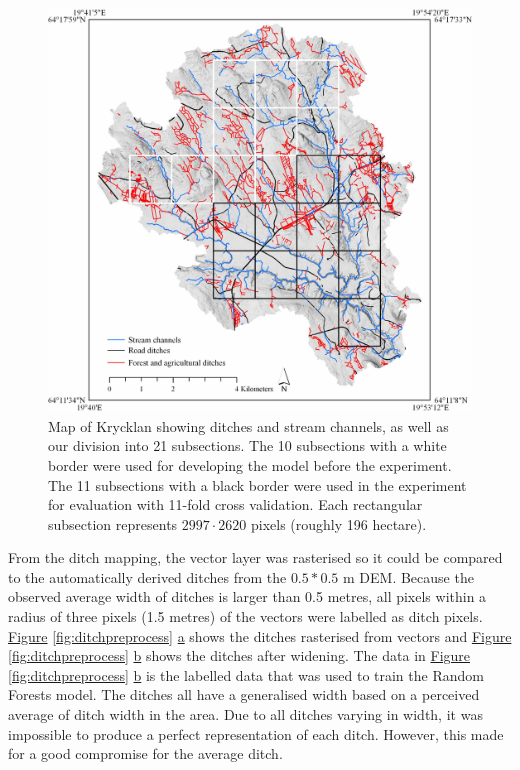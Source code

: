 \documentclass[]{interact}
\theoremstyle{plain}%
\theoremstyle{definition}
\theoremstyle{remark}
\begin{document}
\begin{figure}
    \centering
    \includegraphics[width=1\linewidth]{./images/Krycklan_lo.jpg}
    \caption{Map of Krycklan showing ditches and stream channels, as well as our division into 21 subsections. The 10 subsections with a white border were used for developing the model before the experiment. The 11 subsections with a black border were used in the experiment for evaluation with 11-fold cross validation. Each rectangular subsection represents $2997 \cdot 2620$ pixels (roughly 196 hectare).}
    \label{fig:swedenkrycklan}
\end{figure}

From the ditch mapping, the vector layer was rasterised so it could be compared to the automatically derived ditches from the $0.5*0.5$ m DEM. Because the observed average width of ditches is larger than 0.5 metres, all pixels within a radius of three pixels (1.5 metres) of the vectors were labelled as ditch pixels. \hyperref[fig:ditchpreprocess]{Figure} \ref{fig:ditchpreprocess} \hyperref[fig:ditchpreprocess]{a} shows the ditches rasterised from vectors and \hyperref[fig:ditchpreprocess]{Figure} \ref{fig:ditchpreprocess} \hyperref[fig:ditchpreprocess]{b} shows the ditches after widening. The data in \hyperref[fig:ditchpreprocess]{Figure} \ref{fig:ditchpreprocess} \hyperref[fig:ditchpreprocess]{b} is the labelled data that was used to train the Random Forests model. The ditches all have a generalised width based on a perceived average of ditch width in the area. Due to all ditches varying in width, it was impossible to produce a perfect representation of each ditch. However, this made for a good compromise for the average ditch.
\end{document}
